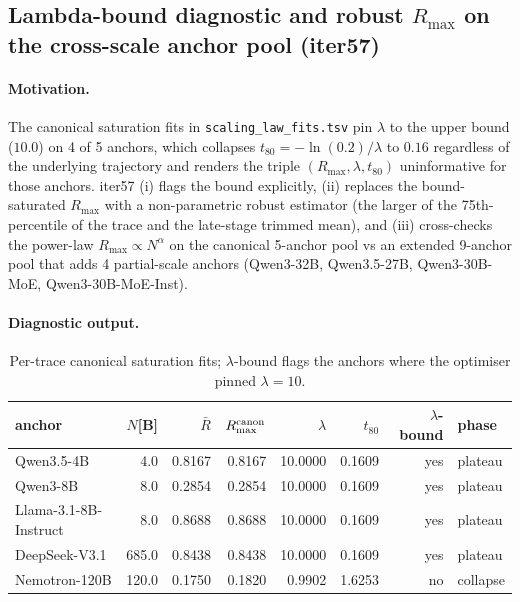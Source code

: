 \subsection{Lambda-bound diagnostic and robust $R_{\max}$ on the cross-scale anchor pool (iter57)}
\label{sec:scaling-law-iter57}
\paragraph{Motivation.}
The canonical saturation fits in \texttt{scaling\_law\_fits.tsv} pin $\lambda$ to the upper bound ($10.0$) on 4 of 5 anchors, which collapses $t_{80}=-\ln(0.2)/\lambda$ to $0.16$ regardless of the underlying trajectory and renders the triple $(R_{\max},\lambda,t_{80})$ uninformative for those anchors. iter57 (i) flags the bound explicitly, (ii) replaces the bound-saturated $R_{\max}$ with a non-parametric robust estimator (the larger of the 75th-percentile of the trace and the late-stage trimmed mean), and (iii) cross-checks the power-law $R_{\max}\propto N^{\alpha}$ on the canonical 5-anchor pool vs an extended 9-anchor pool that adds 4 partial-scale anchors (Qwen3-32B, Qwen3.5-27B, Qwen3-30B-MoE, Qwen3-30B-MoE-Inst).

\paragraph{Diagnostic output.}
\begin{table}[ht]
\centering\small
\begin{tabular}{lrrrrrrl}
\toprule
anchor & $N$[B] & $\bar R$ & $R_{\max}^{\rm canon}$ & $\lambda$ & $t_{80}$ & $\lambda$-bound & phase \\
\midrule
Qwen3.5-4B & 4.0 & 0.8167 & 0.8167 & 10.0000 & 0.1609 & yes & plateau \\
Qwen3-8B & 8.0 & 0.2854 & 0.2854 & 10.0000 & 0.1609 & yes & plateau \\
Llama-3.1-8B-Instruct & 8.0 & 0.8688 & 0.8688 & 10.0000 & 0.1609 & yes & plateau \\
DeepSeek-V3.1 & 685.0 & 0.8438 & 0.8438 & 10.0000 & 0.1609 & yes & plateau \\
Nemotron-120B & 120.0 & 0.1750 & 0.1820 & 0.9902 & 1.6253 & no & collapse \\
\bottomrule
\end{tabular}
\caption{Per-trace canonical saturation fits; $\lambda$-bound flags the anchors where the optimiser pinned $\lambda=10$.}
\end{table}

